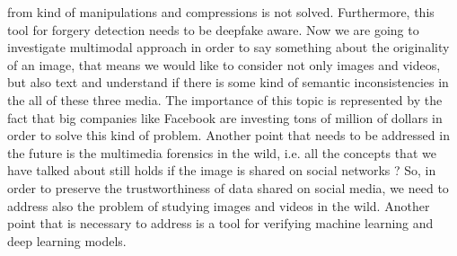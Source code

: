 \documentclass[11pt]{article}
\begin{document}
from kind of manipulations and compressions is not solved. Furthermore, this tool for forgery detection needs to be deepfake aware. Now we are going to investigate multimodal approach in order to say something about the originality of an image, that means we would like to consider not only images and videos, but also text and understand if there is some kind of semantic inconsistencies in the all of these three media. The importance of this topic is represented by the fact that big companies like Facebook are investing tons of million of dollars in order to solve this kind of problem. Another point that needs to be addressed in the future is the multimedia forensics in the wild, i.e. all the concepts that we have talked about still holds if the image is shared on social networks ? So, in order to preserve the trustworthiness of data shared on social media, we need to address also the problem of studying images and videos in the wild. Another point that is necessary to address is a tool for verifying machine learning and deep learning models.
\end{document}
